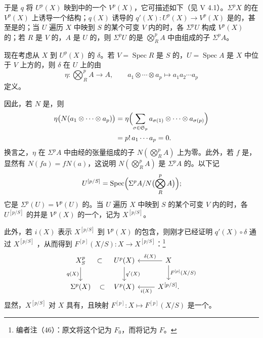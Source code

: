 于是 $q$ 将 $U^p(X)$ 映到中的一个 $V^p(X)$，它可描述如下（见 V 4.1）。$\Sigma^p X$ 的在 $V^p(X)$ 上诱导一个结构；$q(X)$ 诱导的 $q'(X):U^p(X)\to V^p(X)$ 是的，甚至是的；当 $U$ 遍历 $X$ 中映到 $S$ 的某个可变 $V$ 内的时，各 $\Sigma^pU$ 构成 $V^p(X)$ 的；若 $R$ 是 $V$ 的，$A$ 是 $U$ 的，则 $\Sigma^pU$ 的是 $\bigotimes_R^p A$ 中由组成的子 $\Sigma^p A$。

现在考虑从 $X$ 到 $U^p(X)$ 的 $\delta$。若 $V=\operatorname{Spec}R$ 是 $S$ 的，$U=\operatorname{Spec}A$ 是 $X$ 中位于 $V$ 上方的，则 $\delta$ 在 $U$ 上的由
\[
\eta:\bigotimes_R^p A\longrightarrow A,\qquad a_1\otimes\cdots\otimes a_p\longmapsto a_1a_2\cdots a_p
\]
定义。

因此，若 $N$ 是，则
\[
\begin{aligned}
\eta\bigl(N(a_1\otimes\cdots\otimes a_p)\bigr)
&=\eta\Bigl(\sum_{\sigma\in\mathfrak S_p}a_{\sigma(1)}\otimes\cdots\otimes a_{\sigma(p)}\Bigr)\\
&=p!\,a_1\cdots a_p=0.
\end{aligned}
\]
换言之，$\eta$ 在 $\Sigma^p A$ 中由经的张量组成的子 $N(\bigotimes_R^p A)$ 上为零。此外，若 $f$ 是，显然有 $N(fa)=fN(a)$，这说明 $N(\bigotimes_R^p A)$ 是 $\Sigma^p A$ 的。以下记
\[
U^{[p/S]}=\operatorname{Spec}\Bigl(\Sigma^p A/N\bigl(\bigotimes_R^p A\bigr)\Bigr);
\]
它是 $\Sigma^p(U)=V^p(U)$ 的。当 $U$ 遍历 $X$ 中映到 $S$ 的某个可变 $V$ 内的时，各 $U^{[p/S]}$ 的并是 $V^p(X)$ 的一个，记为 $X^{[p/S]}$。

此外，若 $i(X)$ 表示 $X^{[p/S]}$ 到 $V^p(X)$ 的包含，则刚才已经证明 $q'(X)\circ\delta$ 通过 $X^{[p/S]}$ ，从而得到 $F^{[p]}(X/S):X\to X^{[p/S]}$：\footnote{编者注（46）：原文将这个记为 $F_0$，而将记为 $F$。}
\[
\begin{tikzcd}
X_S^p\arrow[d,"q(X)"']&U^p(X)\arrow[l,phantom,"\subset"]\arrow[d,"q'(X)"]&X\arrow[l,"\delta(X)"']\arrow[d,"{F^{[p]}(X/S)}"]\\
\Sigma^p(X)&V^p(X)\arrow[l,phantom,"\subset"]&X^{[p/S]}\arrow[l,"i(X)"] .
\end{tikzcd}
\]
显然，$X^{[p/S]}$ 对 $X$ 具有，且映射 $F^{[p]}:X\mapsto F^{[p]}(X/S)$ 是一个。

